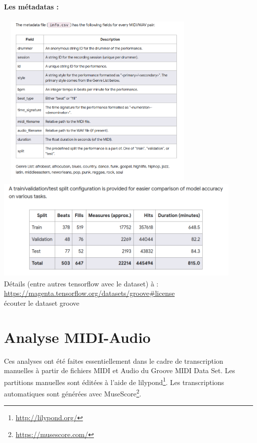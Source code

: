 \textbf{Les métadatas :}\\\\
\includegraphics[height=85mm, 
width=100mm]{z_images/3_groove/csv_metadata_struct.png}\\
\includegraphics[height=50mm, width=120mm]{z_images/3_groove/train_validation_test.png}\\
Détails (entre autres tensorflow avec le dataset) à :
\url{https://magenta.tensorflow.org/datasets/groove#license}\\
écouter le dataset groove
\section{Analyse MIDI-Audio}
\label{analyse_midi_audio}
Ces analyses ont été faites essentiellement dans le cadre de transcription manuelles à partir de fichiers MIDI et Audio du Groove MIDI Data Set. Les partitions manuelles sont éditées à l’aide de lilypond\footnote{\url{http://lilypond.org/}}. Les transcriptions automatiques sont générées avec MuseScore\footnote{\url{https://musescore.com/}}.
